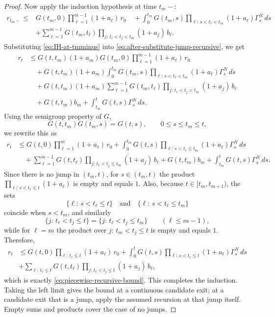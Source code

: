 \begin{proof}
Now apply the induction hypothesis at time $t_m-$:
\begin{align}
r_{t_m-}\le&
G(t_m,0)\prod_{\ell=1}^{m-1}(1+a_\ell)\,r_0\quad
+
\int_0^{t_m}
G(t_m,s)\prod_{\ell:\,s<t_\ell<t_m}(1+a_\ell)\Gamma_s^N\,ds\\
&+
\sum_{\ell=1}^{m-1}
G(t_m,t_\ell)\prod_{j:\,t_\ell<t_j<t_m}(1+a_j)\,b_\ell.
\label{eq:IH-at-tmminus}
\end{align}
Substituting \eqref{eq:IH-at-tmminus} into
\eqref{eq:after-substitute-jump-recursive}, we get
\begin{align*}
r_t
&\le
G(t,t_m)(1+a_m)G(t_m,0)\prod_{\ell=1}^{m-1}(1+a_\ell)\,r_0
\\
&\quad
+
G(t,t_m)(1+a_m)
\int_0^{t_m}
G(t_m,s)\prod_{\ell:\,s<t_\ell<t_m}(1+a_\ell)\Gamma_s^N\,ds
\\
&\quad
+
G(t,t_m)(1+a_m)
\sum_{\ell=1}^{m-1}
G(t_m,t_\ell)\prod_{j:\,t_\ell<t_j<t_m}(1+a_j)\,b_\ell
\\
&\quad
+
G(t,t_m)b_m
+
\int_{t_m}^t G(t,s)\Gamma_s^N\,ds.
\end{align*}
Using the semigroup property of $G$,
\[
G(t,t_m)G(t_m,s)=G(t,s),
\qquad 0\le s\le t_m\le t,
\]
we rewrite this as
\begin{align*}
r_t
&\le
G(t,0)\prod_{\ell=1}^{m}(1+a_\ell)\,r_0
+
\int_0^{t_m}
G(t,s)\prod_{\ell:\,s<t_\ell\le t_m}(1+a_\ell)\Gamma_s^N\,ds
\\
&\quad
+
\sum_{\ell=1}^{m-1}
G(t,t_\ell)\prod_{j:\,t_\ell<t_j\le t_m}(1+a_j)\,b_\ell
+
G(t,t_m)b_m
+
\int_{t_m}^t G(t,s)\Gamma_s^N\,ds.
\end{align*}
Since there is no jump in $(t_m,t)$, for $s\in(t_m,t)$ the product
$\prod_{\ell:\,s<t_\ell\le t}(1+a_\ell)$ is empty and equals $1$.
Also, because $t\in[t_m,t_{m+1})$, the sets
\[
\{\ell:\,s<t_\ell\le t\}
\quad\text{and}\quad
\{\ell:\,s<t_\ell\le t_m\}
\]
coincide when $s<t_m$, and similarly
\[
\{j:\,t_\ell<t_j\le t\}
=
\{j:\,t_\ell<t_j\le t_m\}
\qquad (\ell\le m-1),
\]
while for $\ell=m$ the product over $j:\,t_m<t_j\le t$ is empty and equals $1$.
Therefore,
\begin{align*}
r_t&\le
G(t,0)\prod_{\ell:\,t_\ell\le t}(1+a_\ell)\,r_0
+
\int_0^t
G(t,s)\prod_{\ell:\,s<t_\ell\le t}(1+a_\ell)\Gamma_s^N\,ds\\
&+
\sum_{\ell:\,t_\ell\le t}
G(t,t_\ell)\prod_{j:\,t_\ell<t_j\le t}(1+a_j)\,b_\ell,
\end{align*}
which is exactly \eqref{eq:piecewise-recursive-bound}. This completes the induction. Taking the left limit gives the bound at a continuous candidate exit; at a candidate exit that is a jump, apply the assumed recursion at that jump itself. Empty sums and products cover the case of no jumps.
\end{proof}

